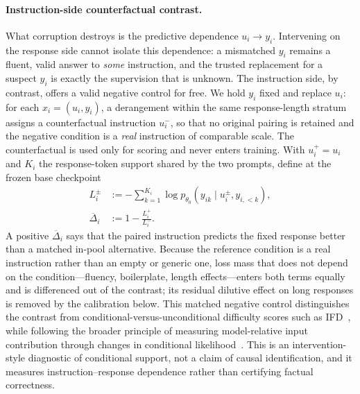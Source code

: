 \paragraph{Instruction-side counterfactual contrast.}
What corruption destroys is the predictive dependence
\(u_i\!\to\!y_i\). Intervening on the response side cannot isolate
this dependence: a mismatched \(y_i\) remains a fluent, valid answer
to \emph{some} instruction, and the trusted replacement for a
suspect \(y_i\) is exactly the supervision that is unknown. The
instruction side, by contrast, offers a valid negative control for
free. We hold \(y_i\) fixed and replace \(u_i\): for each
\(x_i=(u_i,y_i)\), a derangement within the same response-length
stratum assigns a counterfactual instruction \(u_i^-\), so that no
original pairing is retained and the negative condition is a
\emph{real} instruction of comparable scale. The counterfactual is
used only for scoring and never enters training. With
\(u_i^+=u_i\) and \(K_i\) the response-token support shared by the
two prompts, define at the frozen base checkpoint
\begin{equation}
\begin{aligned}
  L_i^{\pm}
  &:=-\sum_{k=1}^{K_i}
  \log p_{\theta_0}(y_{ik}\mid u_i^{\pm},y_{i,<k}),
  \\
  \overline{\Delta}_i
  &:=1-\frac{L_i^+}{L_i^-}.
\end{aligned}
  \label{eq:gate-counterfactual-support}
\end{equation}
A positive \(\overline{\Delta}_i\) says that the paired instruction
predicts the fixed response better than a matched in-pool
alternative. Because the reference condition is a real instruction
rather than an empty or generic one, loss mass that does not depend
on the condition---fluency, boilerplate, length effects---enters
both terms equally and is differenced out of the contrast; its
residual dilutive effect on long responses is removed by the
calibration below. This matched negative control distinguishes the contrast
from conditional-versus-unconditional difficulty scores such as
IFD~\cite{q2q}, while following the broader principle of measuring
model-relative input contribution through changes in conditional
likelihood~\cite{ethayarajh2022usable}. This is an
intervention-style diagnostic of conditional support, not a claim
of causal identification, and it measures
instruction--response dependence rather than certifying factual
correctness.

